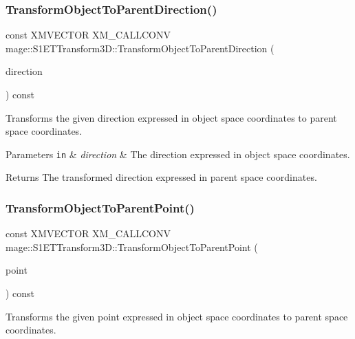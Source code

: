 \subsubsection{\texorpdfstring{Transform\+Object\+To\+Parent\+Direction()}{TransformObjectToParentDirection()}}
{\footnotesize\ttfamily const X\+M\+V\+E\+C\+T\+OR X\+M\+\_\+\+C\+A\+L\+L\+C\+O\+NV mage\+::\+S1\+E\+T\+Transform3\+D\+::\+Transform\+Object\+To\+Parent\+Direction (\begin{DoxyParamCaption}\item[{F\+X\+M\+V\+E\+C\+T\+OR}]{direction }\end{DoxyParamCaption}) const\hspace{0.3cm}{\ttfamily [noexcept]}}

Transforms the given direction expressed in object space coordinates to parent space coordinates.


\begin{DoxyParams}[1]{Parameters}
\mbox{\tt in}  & {\em direction} & The direction expressed in object space coordinates. \\
\hline
\end{DoxyParams}
\begin{DoxyReturn}{Returns}
The transformed direction expressed in parent space coordinates. 
\end{DoxyReturn}
\mbox{\label{classmage_1_1_s1_e_t_transform3_d_a48b1888b21db8fd6822c1ff7fbe8a979}} 
\subsubsection{\texorpdfstring{Transform\+Object\+To\+Parent\+Point()}{TransformObjectToParentPoint()}}
{\footnotesize\ttfamily const X\+M\+V\+E\+C\+T\+OR X\+M\+\_\+\+C\+A\+L\+L\+C\+O\+NV mage\+::\+S1\+E\+T\+Transform3\+D\+::\+Transform\+Object\+To\+Parent\+Point (\begin{DoxyParamCaption}\item[{F\+X\+M\+V\+E\+C\+T\+OR}]{point }\end{DoxyParamCaption}) const\hspace{0.3cm}{\ttfamily [noexcept]}}

Transforms the given point expressed in object space coordinates to parent space coordinates.


